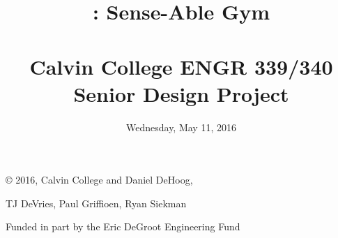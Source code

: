 \documentclass{article}
\title{
\vspace{2in}
\textmd{\textbf{\TeamName: Sense-Able Gym}}\\
\textmd{\textbf\DocTitle}\\
\vspace{0.1in}\large{Calvin College ENGR 339/340 Senior Design Project}
\vspace{3in}
}
\author{\textbf{\DocAuthorName}}
\date{Wednesday, May 11, 2016} %
\begin{document}
\maketitle{}
\thispagestyle{empty} %



\newpage
\vspace*{\fill}
\centerline{\copyright{} 2016, Calvin College and Daniel DeHoog,}
\centerline{TJ DeVries, Paul Griffioen, Ryan Siekman}
\centerline{}
\centerline{Funded in part by the Eric DeGroot Engineering Fund}
\vspace*{\fill}


\newpage




\newpage
\tableofcontents

\newpage


\newpage


\newpage






















\newpage


\end{document}

